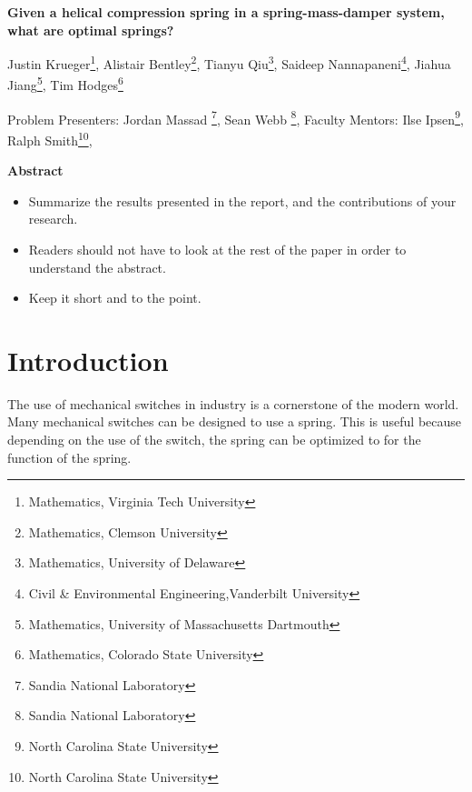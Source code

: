 \documentclass[10pt]{article}
\begin{document}
\centerline{\large \bf Given a helical compression spring in a spring-mass-damper system, what are optimal springs?}

\vspace{.1truein}

\def\thefootnote{\arabic{footnote}}
\begin{center}
  Justin Krueger\footnote{Mathematics, Virginia Tech University},
  Alistair Bentley\footnote{Mathematics, Clemson University},
  Tianyu Qiu\footnote{Mathematics, University of Delaware},
  Saideep Nannapaneni\footnote{Civil \& Environmental Engineering,Vanderbilt University},
  Jiahua Jiang\footnote{Mathematics, University of Massachusetts Dartmouth },
  Tim Hodges\footnote{Mathematics, Colorado State University}
\end{center}


\begin{center}
Problem Presenters: Jordan Massad \footnote{Sandia National Laboratory},
Sean Webb \footnote{Sandia National Laboratory},
	Faculty Mentors: Ilse Ipsen\footnote{North Carolina State University},
	Ralph Smith\footnote{North Carolina State University}, 
\end{center}


\vspace{.3truein}
\centerline{\bf Abstract}




\begin{itemize}
\item Summarize the results presented in the report, and the contributions
of your research.




\item Readers should not have to look at the rest of the paper in order to 
understand the abstract.

\item Keep it short and to the point.
\end{itemize}

\section{Introduction}

The use of mechanical switches in industry is a cornerstone of the modern world. Many mechanical switches can be designed to use a spring. This is useful because depending on the use of the switch, the spring can be optimized to for the function of the spring. 
\end{document}
